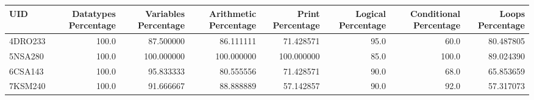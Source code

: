 \begin{tabular}{lrrrrrrr}
\toprule
    UID &  Datatypes Percentage &  Variables Percentage &  Arithmetic Percentage &  Print Percentage &  Logical Percentage &  Conditional Percentage &  Loops Percentage \\
\midrule
4DRO233 &                 100.0 &             87.500000 &              86.111111 &         71.428571 &                95.0 &                    60.0 &         80.487805 \\
5NSA280 &                 100.0 &            100.000000 &             100.000000 &        100.000000 &                85.0 &                   100.0 &         89.024390 \\
6CSA143 &                 100.0 &             95.833333 &              80.555556 &         71.428571 &                90.0 &                    68.0 &         65.853659 \\
7KSM240 &                 100.0 &             91.666667 &              88.888889 &         57.142857 &                90.0 &                    92.0 &         57.317073 \\
\bottomrule
\end{tabular}
